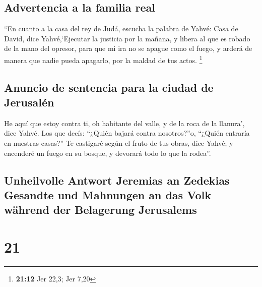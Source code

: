 \begin{paracol}{2}
\hypertarget{advertencia-a-la-familia-real}{%
\subsection{Advertencia a la familia
real}\label{advertencia-a-la-familia-real}}

 ``En cuanto a la casa del rey de Judá, escucha la
palabra de Yahvé:  Casa de David, dice Yahvé,`Ejecutar la
justicia por la mañana, y libera al que es robado de la mano del
opresor, para que mi ira no se apague como el fuego, y arderá de manera
que nadie pueda apagarlo, por la maldad de tus actos. \footnote{\textbf{21:12}
  Jer 22,3; Jer 7,20}

\hypertarget{anuncio-de-sentencia-para-la-ciudad-de-jerusaluxe9n}{%
\subsection{Anuncio de sentencia para la ciudad de
Jerusalén}\label{anuncio-de-sentencia-para-la-ciudad-de-jerusaluxe9n}}

 He aquí que estoy contra ti, oh habitante del valle, y
de la roca de la llanura', dice Yahvé. Los que decís: ``¿Quién bajará
contra nosotros?''o, ``¿Quién entraría en nuestras casas?''
 Te castigaré según el fruto de tus obras, dice Yahvé; y
encenderé un fuego en su bosque, y devorará todo lo que la rodea''.

\switchcolumn
\begin{otherlanguage}{english}

\hypertarget{unheilvolle-antwort-jeremias-an-zedekias-gesandte-und-mahnungen-an-das-volk-wuxe4hrend-der-belagerung-jerusalems-1}{%
\subsection{Unheilvolle Antwort Jeremias an Zedekias Gesandte und
Mahnungen an das Volk während der Belagerung
Jerusalems}\label{unheilvolle-antwort-jeremias-an-zedekias-gesandte-und-mahnungen-an-das-volk-wuxe4hrend-der-belagerung-jerusalems-1}}

\hypertarget{section-41}{%
\section{21}\label{section-41}}


\end{otherlanguage}
\end{paracol}
